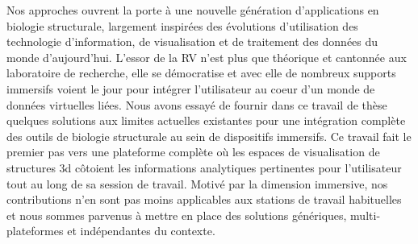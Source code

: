 Nos approches ouvrent la porte à une nouvelle génération d'applications en biologie structurale, largement inspirées des évolutions d'utilisation des technologie d'information, de visualisation et de traitement des données du monde d'aujourd'hui. L'essor de la RV n'est plus que théorique et cantonnée aux laboratoire de recherche, elle se démocratise et avec elle de nombreux supports immersifs voient le jour pour intégrer l'utilisateur au coeur d'un monde de données virtuelles liées. Nous avons essayé de fournir dans ce travail de thèse quelques solutions aux limites actuelles existantes pour une intégration complète des outils de biologie structurale au sein de dispositifs immersifs. Ce travail fait le premier pas vers une plateforme complète où les espaces de visualisation de structures 3d côtoient les informations analytiques pertinentes pour l'utilisateur tout au long de sa session de travail. Motivé par la dimension immersive, nos contributions n'en sont pas moins applicables aux stations de travail habituelles et nous sommes parvenus à mettre en place des solutions génériques, multi-plateformes et indépendantes du contexte.
